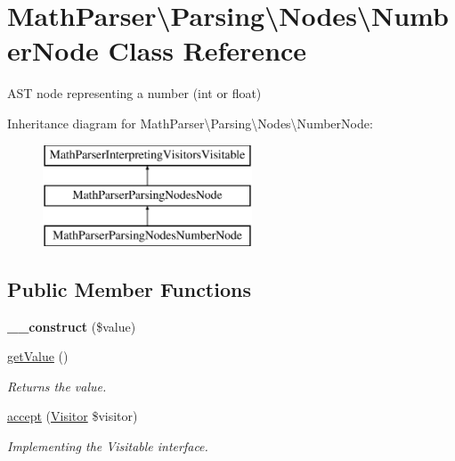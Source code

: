 \hypertarget{classMathParser_1_1Parsing_1_1Nodes_1_1NumberNode}{\section{Math\-Parser\textbackslash{}Parsing\textbackslash{}Nodes\textbackslash{}Number\-Node Class Reference}
\label{classMathParser_1_1Parsing_1_1Nodes_1_1NumberNode}
}


A\-S\-T node representing a number (int or float)  


Inheritance diagram for Math\-Parser\textbackslash{}Parsing\textbackslash{}Nodes\textbackslash{}Number\-Node\-:\begin{figure}[H]
\begin{center}
\leavevmode
\includegraphics[height=3.000000cm]{classMathParser_1_1Parsing_1_1Nodes_1_1NumberNode}
\end{center}
\end{figure}
\subsection*{Public Member Functions}
\begin{DoxyCompactItemize}
\item 
\hypertarget{classMathParser_1_1Parsing_1_1Nodes_1_1NumberNode_abf2cc9dcf5655fcd73d6045a39008835}{{\bfseries \-\_\-\-\_\-construct} (\$value)}\label{classMathParser_1_1Parsing_1_1Nodes_1_1NumberNode_abf2cc9dcf5655fcd73d6045a39008835}

\item 
\hyperlink{classMathParser_1_1Parsing_1_1Nodes_1_1NumberNode_a9929ffd441d3753c1244be6667cd13fb}{get\-Value} ()
\begin{DoxyCompactList}\small\item\em Returns the value. \end{DoxyCompactList}\item 
\hypertarget{classMathParser_1_1Parsing_1_1Nodes_1_1NumberNode_afe0acdb60d40d8f053a00cddef53a2d4}{\hyperlink{classMathParser_1_1Parsing_1_1Nodes_1_1NumberNode_afe0acdb60d40d8f053a00cddef53a2d4}{accept} (\hyperlink{interfaceMathParser_1_1Interpreting_1_1Visitors_1_1Visitor}{Visitor} \$visitor)}\label{classMathParser_1_1Parsing_1_1Nodes_1_1NumberNode_afe0acdb60d40d8f053a00cddef53a2d4}

\begin{DoxyCompactList}\small\item\em Implementing the Visitable interface. \end{DoxyCompactList}\end{DoxyCompactItemize}
